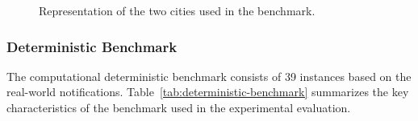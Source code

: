 \begin{figure}[h!]
\begin{minipage}[c]{.49\textwidth}
	\end{minipage}%
	\begin{minipage}[c]{.49\textwidth}
		\centering
	\end{minipage}
	\caption{\label{fig:graph-examples} Representation of the two cities used in the benchmark.}
\end{figure}

\subsubsection{Deterministic Benchmark}

The computational deterministic benchmark consists of 39 instances based on the real-world notifications. Table~\ref{tab:deterministic-benchmark} summarizes the key characteristics of the benchmark used in the experimental evaluation.

